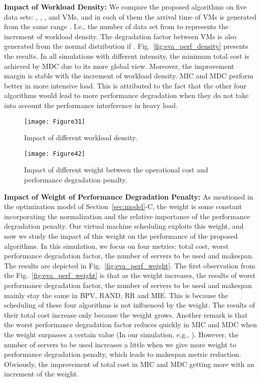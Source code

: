 \documentclass[10pt,journal]{IEEEtran}
\begin{document}
\textbf{Impact of Workload Density:} We compare the proposed algorithms on five data sets: , , ,  and  VMs, and in each of them the arrival time of VMs is generated from the same range . I.e., the number of data set from  to  represents the increment of workload density. The degradation factor between VMs is also generated from the normal distribution   if . Fig.~\ref{fig:eva_perf_density} presents the results. In all simulations with different intensity, the minimum total cost is achieved by MDC due to its more global view. Moreover, the improvement margin is stable with the increment of workload density. MIC and MDC perform better in more intensive load. This is attributed to the fact that the other four algorithms would lead to more performance degradation when they do not take into account the performance interference in heavy load.
\begin{figure}[htbp]
\centering
\texttt{[image: Figure31]}
\centering
\caption{\label{fig:eva_perf_density}Impact of different workload density.}\label{fig:graph}
\end{figure}
\begin{figure*}[htbp]
\centering
\texttt{[image: Figure42]}
\centering
\caption{\label{fig:eva_perf_weight}Impact of different weight  between the operational cost and performance degradation penalty.}\label{fig:graph}
\end{figure*}

\textbf{Impact of Weight of Performance Degradation Penalty:} As mentioned in the optimization model of Section~\ref{sec:model}-C, the weight  is some constant incorporating the normalization and the relative importance of the performance degradation penalty. Our virtual machine scheduling exploits this weight, and now we study the impact of this weight on the performance of the proposed algorithms. In this simulation, we focus on four metrics: total cost, worst performance degradation factor, the number of servers to be used and makespan. The results are depicted in Fig.~\ref{fig:eva_perf_weight}. The first observation from the Fig.~\ref{fig:eva_perf_weight} is that as the weight increases, the results of worst performance degradation factor, the number of servers to be used and makespan mainly stay the same in BPV, RAND, RR and MIE. This is because the scheduling of these four algorithms is not influenced by the weight. The results of their total cost increase only because the weight  grows. Another remark is that the worst performance degradation factor reduces quickly in MIC and MDC when the weight surpasses a certain value (In our simulation, e.g., ). However, the number of servers to be used increases a little when we give more weight to performance degradation penalty, which leads to makespan metric reduction. Obviously, the improvement of total cost in MIC and MDC getting more with an increment of the weight.
\end{document}
